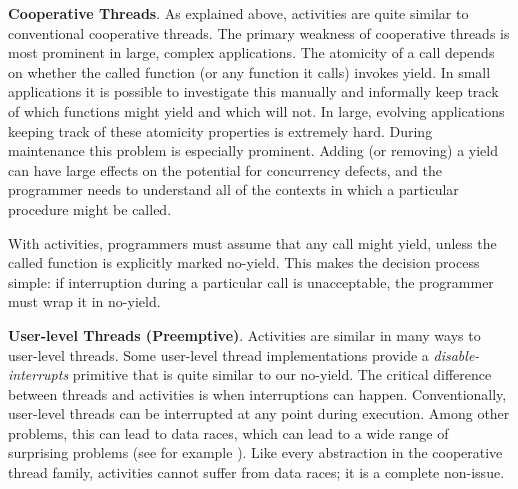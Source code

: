 \documentclass[9pt,preprint]{sigplanconf-2}
\begin{document}
\textbf{Cooperative Threads}.
As explained above, activities are quite similar to conventional cooperative threads.
The primary weakness of cooperative threads is most prominent in large, complex applications.
The atomicity of a call depends on whether the called function (or any function it calls) invokes yield.
In small applications it is possible to investigate this manually and informally keep track of which functions might yield and which will not.
In large, evolving applications keeping track of these atomicity properties is extremely hard.
During maintenance this problem is especially prominent.
Adding (or removing) a yield can have large effects on the potential for concurrency defects, and the programmer needs to understand all of the contexts in which a particular procedure might be called.

With activities, programmers must assume that any call might yield, unless the called function is explicitly marked no-yield.
This makes the decision process simple: if interruption during a particular call is unacceptable, the programmer must wrap it in no-yield.



\textbf{User-level Threads (Preemptive)}.
Activities are similar in many ways to user-level threads.
Some user-level thread implementations provide a \emph{disable-interrupts} primitive that is quite similar to our no-yield.
The critical difference between threads and activities is when interruptions can happen.
Conventionally, user-level threads can be interrupted at any point during execution.
Among other problems, this can lead to data races, which can lead to a wide range of surprising problems (see for example \cite{Boehm2011}).
Like every abstraction in the cooperative thread family, activities cannot suffer from data races; it is a complete non-issue.
\end{document}
